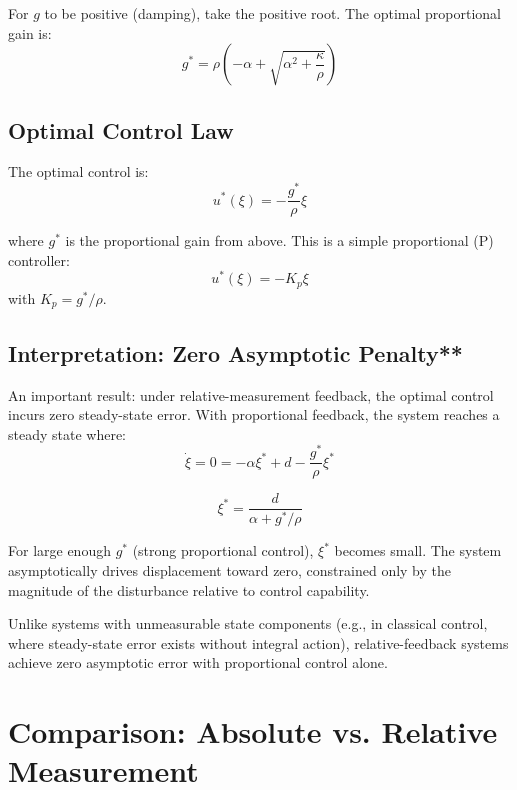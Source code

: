 \documentclass[12pt]{article}
\begin{document}
For $g$ to be positive (damping), take the positive root. The optimal proportional gain is:
\begin{equation}
g^* = \rho \left( -\alpha + \sqrt{\alpha^2 + \frac{\kappa}{\rho}} \right)
\end{equation}

\subsection{Optimal Control Law}

The optimal control is:
\begin{equation}
u^*(\xi) = -\frac{g^*}{\rho} \xi
\end{equation}

where $g^*$ is the proportional gain from above. This is a simple proportional (P) controller:
\begin{equation}
u^*(\xi) = -K_p \xi
\end{equation}
with $K_p = g^* / \rho$.

\subsection{Interpretation: Zero Asymptotic Penalty**}

An important result: under relative-measurement feedback, the optimal control incurs zero steady-state error. With proportional feedback, the system reaches a steady state where:
\begin{equation}
\dot{\xi} = 0 = -\alpha \xi^* + d - \frac{g^*}{\rho} \xi^*
\end{equation}

\begin{equation}
\xi^* = \frac{d}{\alpha + g^*/\rho}
\end{equation}

For large enough $g^*$ (strong proportional control), $\xi^*$ becomes small. The system asymptotically drives displacement toward zero, constrained only by the magnitude of the disturbance relative to control capability.

Unlike systems with unmeasurable state components (e.g., in classical control, where steady-state error exists without integral action), relative-feedback systems achieve zero asymptotic error with proportional control alone.

\section{Comparison: Absolute vs. Relative Measurement}
\end{document}
